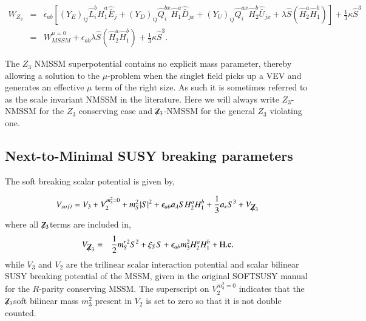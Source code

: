 \documentclass[final,3p,times,pdflatex]{elsarticle}
\newcommand{\be}{\begin{equation}}
\newcommand{\ee}{\end{equation}}
\newcommand{\ba}{\begin{eqnarray}}
\newcommand{\ea}{\end{eqnarray}}
\newcommand{\Zv}{{\mbox{${\not\!\!Z_3}$}}}
\begin{document}
\ba 
 W_{Z_3} &=& \epsilon_{ab} \left[ (Y_E)_{ij} \hat L_i^b
\hat H_1^a \hat{\bar E}_j + (Y_D)_{ij} \hat Q_i^{bx} \hat H_1^a \hat{\bar D}_{jx} +
(Y_U)_{ij} \hat Q_i^{ax} \hat H_2^b \hat{\bar U}_{jx}  
+\lambda \hat{S}(\hat{H}^a_2 \hat{H}^b_1) \right ]+\frac{1}{3}\kappa\hat{S}^3 \\
 &=& W_{MSSM}^{\mu =0}  + \epsilon_{ab} \lambda \hat{S} (\hat{H}^a_2 \hat{H}^b_1) +\frac{1}{3}\kappa\hat{S}^3.
\label{eq:WZ3C}
\ea


\noindent The $Z_3$ NMSSM superpotential contains no explicit mass parameter, thereby allowing a solution to the $\mu$-problem when the singlet field picks up a VEV and generates an effective $\mu$ term of the right size.   As such it is sometimes referred to as the scale invariant NMSSM in the literature.  Here we will always write $Z_3$-NMSSM for the $Z_3$ conserving case and \Zv-NMSSM for the general $Z_3$ violating one. 


\subsection{Next-to-Minimal SUSY breaking parameters \label{sec:susybreak}}
The soft breaking scalar potential is given by,

\be V_{soft} = V_3 + V^{m_3^2 = 0}_2 + m_S^2|S|^2 + \epsilon_{ab} a_\lambda S H^a_2 H^b_1 + \frac{1}{3} a_\kappa S^3 + V_\Zv \ee where all \Zv terms are included in,
\ba V_\Zv & = & \frac{1}{2}m_S^{\prime \, 2} S^2 + \xi_S S + \epsilon_{ab} m_3^2 H_2^a H_1^b + \textrm{H.c.} \ea while $V_3$ and $V_2$ are the trilinear scalar interaction potential and scalar bilinear SUSY breaking potential of the MSSM, given in the original SOFTSUSY manual for the $R$-parity conserving MSSM\cite{Allanach:2001kg}.   The superscript on $V^{m_3^2 = 0}_2$ indicates that the \Zv soft bilinear mass $m_3^2$ present in $V_2$ is set to zero so that it is not double counted. 

\end{document}
